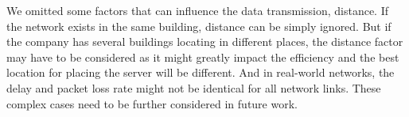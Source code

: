 We omitted some factors that can influence the data transmission, \eg distance. If the network
exists in the same building, distance can be simply ignored. But if the company has several 
buildings locating in different places, the distance factor may have to be considered as it might 
greatly impact the efficiency and the best location for placing the server will be different. 
And in real-world networks, the delay and packet loss rate might not be identical for all 
network links. These complex cases need to be further considered in future work. 